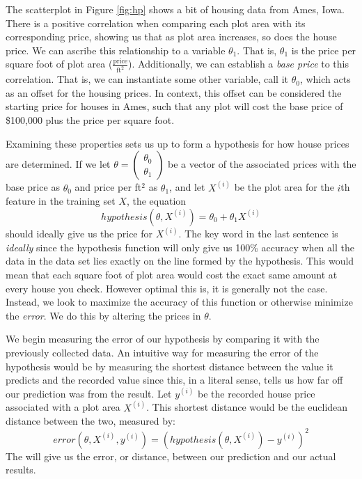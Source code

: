 \documentclass{book}[a5paper]
\begin{document}
The scatterplot in Figure \ref{fig:hp} shows a bit of housing data from
Ames, Iowa. There is a positive correlation when comparing each plot area with its corresponding price, showing us that as plot area increases, so does the house price. We can ascribe this relationship to a variable $\theta_1$. That is, $\theta_1$ is the price per square foot of plot area ($\frac{\text{price}}{\text{ft}^2}$). Additionally, we can establish a \emph{base price} to this correlation. That is, we can instantiate some other variable, call it $\theta_0$, which acts as an offset for the housing prices. In context, this offset can be considered the starting price for houses in Ames, such that any plot will cost the base price of \$100,000 plus the price per square foot.

Examining these properties sets us up to form a hypothesis for how house prices
are determined.  If we let $\theta = \begin{pmatrix}\theta_0 \\ \theta_1\end{pmatrix}$ be a vector of the associated prices
with the base price as $\theta_0$ and price per ft$^2$ as $\theta_1$, and let $X^{(i)}$
be the plot area for the $i$th feature in the training set $X$, the equation
\begin{equation}
    hypothesis(\theta, X^{(i)}) = \theta_0 + \theta_1X^{(i)}
\end{equation}
should ideally give us the price for $X^{(i)}$. The key word in the last sentence is \emph{ideally} since the hypothesis function will only give us 100\% accuracy when all the data in the data set lies exactly on the line formed by the hypothesis. This would mean that each square foot of plot area would cost the exact same amount at every house you check. However optimal this is, it is generally not the case. Instead, we look to maximize the accuracy of this function or otherwise minimize the \emph{error}. We do this by altering the prices in $\theta$.

We begin measuring the error of our hypothesis by comparing it with
the previously collected data.  An intuitive way for measuring the  error of the hypothesis would be by measuring the shortest distance between the value it predicts and the recorded value since this, in a literal sense, tells us how far off our prediction was from the result. Let $y^{(i)}$ be the recorded house price
associated with a plot area $X^{(i)}$. This shortest distance would be the euclidean distance between the two, measured by:
\begin{equation}
    error(\theta, X^{(i)}, y^{(i)}) = (hypothesis(\theta, X^{(i)}) - y^{(i)})^2
\end{equation}
The will give us the error, or distance, between our prediction and our actual
results.
\end{document}
